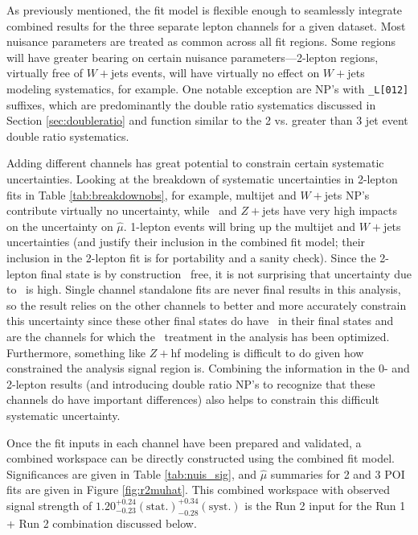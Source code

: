 As previously mentioned, the fit model is flexible enough to seamlessly integrate combined results for the three separate lepton channels for a given dataset.  Most nuisance parameters are treated as common across all fit regions.  Some regions will have greater bearing on certain nuisance parameters---2-lepton regions, virtually free of $W+$jets events, will have virtually no effect on $W+$jets modeling systematics, for example.  One notable exception are NP's with \texttt{\_L[012]} suffixes, which are predominantly the double ratio systematics discussed in Section \ref{sec:doubleratio} and function similar to the 2 vs. greater than 3 jet event double ratio systematics.  

Adding different channels has great potential to constrain certain systematic uncertainties.  Looking at the breakdown of systematic uncertainties in 2-lepton fits in Table \ref{tab:breakdownobs}, for example, multijet and $W+$jets NP's contribute virtually no uncertainty, while \met\ and $Z+$jets have very high impacts on the uncertainty on $\hat{\mu}$.  1-lepton events will bring up the multijet and $W+$jets uncertainties (and justify their inclusion in the combined fit model; their inclusion in the 2-lepton fit is for portability and a sanity check).  Since the 2-lepton final state is by construction \met\ free, it is not surprising that uncertainty due to \met\ is high.  Single channel standalone fits are never final results in this analysis, so the result relies on the other channels to better and more accurately constrain this uncertainty since these other final states do have \met\ in their final states and are the channels for which the \met\ treatment in the analysis has been optimized.  Furthermore, something like $Z+$hf modeling is difficult to do given how constrained the analysis signal region is.  Combining the information in the 0- and 2-lepton results (and introducing double ratio NP's to recognize that these channels do have important differences) also helps to constrain this difficult systematic uncertainty.

Once the fit inputs in each channel have been prepared and validated, a combined workspace can be directly constructed using the combined fit model.  Significances are given in Table \ref{tab:nuis_sig}, and $\hat{\mu}$ summaries for 2 and 3 POI fits are given in Figure \ref{fig:r2muhat}.  This combined workspace with observed signal strength of $1.20^{+0.24}_{-0.23}(\textrm{stat.})^{+0.34}_{-0.28}(\textrm{syst.})$ is the Run 2 input for the Run 1 + Run 2 combination discussed below.

